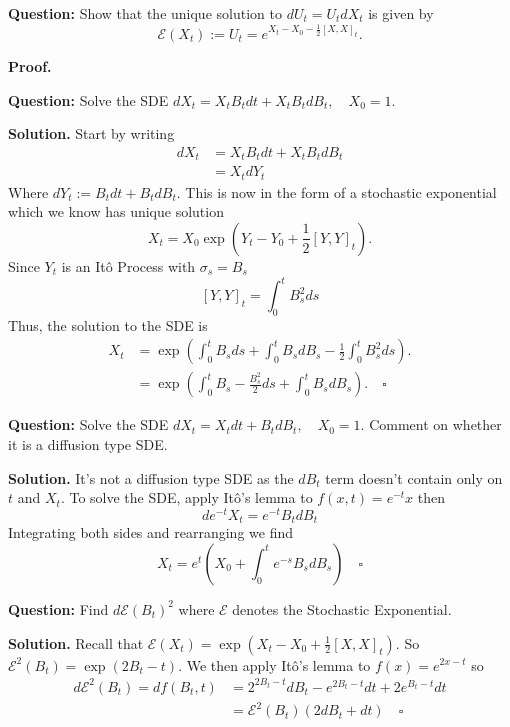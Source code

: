 \documentclass{article}
\begin{document}
\begin{tcolorbox}[colframe=black,colback=gray!5,boxrule=0.5pt]
\textbf{Question:} Show that the unique solution to $dU_t = U_tdX_t$ is given by 
$$\mathcal{E}(X_t) := U_t = e^{X_t - X_0 - \frac{1}{2}[X,X]_t}.$$
\end{tcolorbox}
\textbf{Proof.}

\begin{tcolorbox}[colframe=black,colback=gray!5,boxrule=0.5pt]
\textbf{Question:} Solve the SDE $dX_t = X_tB_tdt + X_tB_tdB_t, \quad X_0=1$.
\end{tcolorbox}
\textbf{Solution.} Start by writing
\begin{align*}
    dX_t &= X_tB_tdt + X_tB_tdB_t \\
    &= X_tdY_t
\end{align*}
Where $dY_t := B_tdt + B_tdB_t$. This is now in the form of a stochastic exponential which we know has unique solution
$$X_t = X_0\exp\left(Y_t - Y_0 + \frac{1}{2}[Y,Y]_t\right).$$
Since $Y_t$ is an Itô Process with $\sigma_s = B_s$
$$[Y,Y]_t = \int_0^t B_s^2 ds$$
Thus, the solution to the SDE is 
\begin{align*}
    X_t &= \exp\left( \int_0^tB_sds + \int_0^t B_sdB_s - \frac{1}{2}\int_0^t B_s^2ds\right). \\
    &= \exp\left( \int_0^tB_s - \frac{B_s^2}{2}ds + \int_0^t B_sdB_s \right). \quad \square
\end{align*}

\begin{tcolorbox}[colframe=black,colback=gray!5,boxrule=0.5pt]
\textbf{Question:} Solve the SDE $dX_t = X_t dt + B_tdB_t, \quad X_0=1$. Comment on whether it is a diffusion type SDE. 
\end{tcolorbox}
\textbf{Solution.} It's not a diffusion type SDE as the $dB_t$ term doesn't contain only on $t$ and $X_t$. To solve the SDE, apply Itô's lemma to $f(x,t) = e^{-t}x$ then 
$$de^{-t}X_t = e^{-t}B_tdB_t$$
Integrating both sides and rearranging we find 
$$X_t = e^t\left(X_0 + \int_0^te^{-s}B_sdB_s\right) \quad \square$$


\begin{tcolorbox}[colframe=black,colback=gray!5,boxrule=0.5pt]
\textbf{Question:} Find $d\mathcal{E}(B_t)^2$ where $\mathcal{E}$ denotes the Stochastic Exponential.
\end{tcolorbox}
\textbf{Solution.} Recall that $\mathcal{E}(X_t) = \exp(X_t - X_0 + \frac{1}{2}[X,X]_t)$. So $\mathcal{E}^2(B_t) = \exp(2B_t - t).$ We then apply Itô's lemma to $f(x)= e^{2x-t}$ so 
\begin{align*}
    d\mathcal{E}^2(B_t) = df(B_t, t) &= 2^{{2B_t-t}}dB_t - e^{2B_t-t}dt + 2e^{B_t-t}dt \\
    &= \mathcal{E}^2(B_t)(2dB_t + dt) \quad \square
\end{align*}
\end{document}
